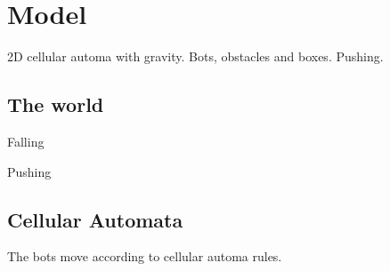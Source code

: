 \section{Model}

2D cellular automa with gravity. Bots, obstacles and boxes. Pushing.

\subsection{The world}
Falling

Pushing

\subsection{Cellular Automata}
The bots move according to cellular automa rules.


